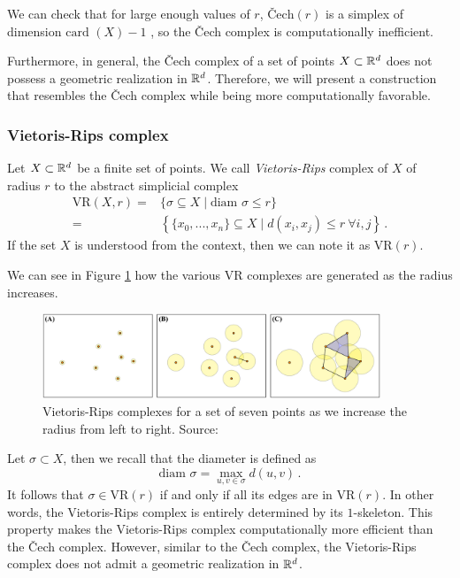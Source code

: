 \documentclass[../main.tex]{subfiles}
\begin{document}
We can check that for large enough values of $r$, $\text{\v{C}ech}(r)$ is a simplex of dimension $\text{card }(X)-1$ {\cite[Chapter~3]{edelsbrunner_computational_2010}}, so the \v{C}ech complex is computationally inefficient.

Furthermore, in general, the \v{C}ech complex of a set of points $X \subset \mathbb{R}^d$ does not possess a geometric realization in $\mathbb{R}^d$. Therefore, we will present a construction that resembles the \v{C}ech complex while being more computationally favorable.

\subsubsection*{Vietoris-Rips complex}

\begin{definition}
Let $X \subset \mathbb{R}^d$ be a finite set of points. We call \emph{Vietoris-Rips} complex of $X$ of radius $r$ to the abstract simplicial complex 
\begin{align*}
\text{VR}(X, r) =& \{\sigma \subseteq  X \mid \textrm{diam } \sigma \leq r\}\\
=&\left\{ \{x_0, ..., x_n\} \subseteq  X \mid d(x_i, x_j) \leq r\ \forall i,j\right\}\,. 
\end{align*}
If the set $X$ is understood from the context, then we can note it as $\text{VR}(r)$.
\end{definition}

We can see in Figure \ref{fig:vr} how the various VR complexes are generated as the radius increases.

\begin{figure}[!ht]
\centering
\includegraphics[width=0.9\textwidth]{figures/bg/vr.png} 
\caption{Vietoris-Rips complexes for a set of seven points as we increase the radius from left to right. Source: \cite{ulmer_topological_2019}}
\label{fig:vr}
\end{figure}

Let $\sigma \subset X$, then we recall that the diameter is defined as
\[\textrm{diam } \sigma = \max_{u,v \in \sigma} d(u,v)\,.\]
It follows that $\sigma \in \text{VR}(r)$ if and only if all its edges are in $\text{VR}(r)$. In other words, the Vietoris-Rips complex is entirely determined by its $1$-skeleton. This property makes the Vietoris-Rips complex computationally more efficient than the \v{C}ech complex. However, similar to the \v{C}ech complex, the Vietoris-Rips complex does not admit a geometric realization in $\mathbb{R}^d$.
\end{document}
